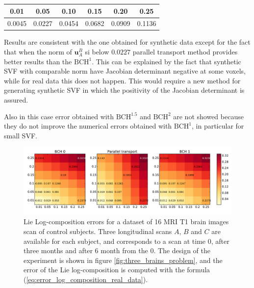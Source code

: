 \begin{center}
 \begin{tabular}{ c | c | c | c | c | c  }
 	0.01 & 0.05 & 0.10 & 0.15 & 0.20 & 0.25 \\
 	\hline
 	 0.0045 &  0.0227 & 0.0454 & 0.0682 & 0.0909 & 0.1136
 \end{tabular}
\end{center}

Results are consistent with the one obtained for synthetic data except for the fact that when the norm of $\mathbf{u}_{A}^{B}$ si below $0.0227$ parallel transport method provides better results than the $\text{BCH}^1$. This can be explained by the fact that synthetic SVF with comparable norm have Jacobian determinant negative at some voxels, while for real data this does not happen. This would require a new method for generating synthetic SVF in which the positivity of the Jacobian determinant is assured.

Also in this case error obtained with $\text{BCH}^{1.5}$ and $\text{BCH}^2$ are not showed because they do not improve the numerical errors obtained with $\text{BCH}^1$, in particular for small SVF. 

\begin{figure}[!ht]
	\hspace{-1.0cm}
	\includegraphics[scale=0.53]{figures/svf_log_composition_real_data_CTL_expo.pdf}
	\caption{Lie Log-composition errors for a dataset of 16 MRI T1 brain images scan of control subjects. Three longitudinal scans $A$, $B$ and $C$ are available for each subject, and corresponds to a scan at time $0$, after three months and after $6$ month from the $0$. The design of the experiment is shown in figure \ref{fig:three_brains_problem}, and the error of the Lie log-composition is computed with the formula (\ref{eq:error_log_composition_real_data}).}
	\label{fig:svf_log_composition_real_data_CTL_expo}
\end{figure}


